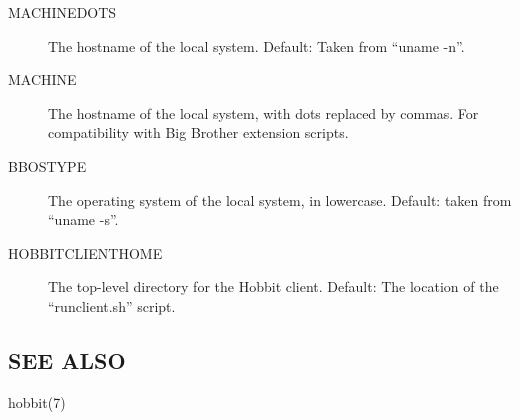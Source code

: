  \begin{description}
\item[MACHINEDOTS] The hostname of the local system. Default: Taken from ``uname -n''. 

 

\item[MACHINE] The hostname of the local system, with dots replaced by
  commas. For compatibility with Big Brother extension scripts. 


 

\item[BBOSTYPE] The operating system of the local system, in lowercase. Default: taken from ``uname -s''. 

 

\item[HOBBITCLIENTHOME] The top-level directory for the Hobbit
  client. Default: The location of the ``runclient.sh'' script. 



\end{description}

\subsection{SEE ALSO}
hobbit(7) 
 
